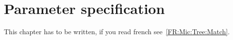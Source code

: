 \chapter{Parameter specification}

\label{Mic:Tree:Match}


This chapter has to be written, if you read french see~\ref{FR:Mic:Tree:Match}.


